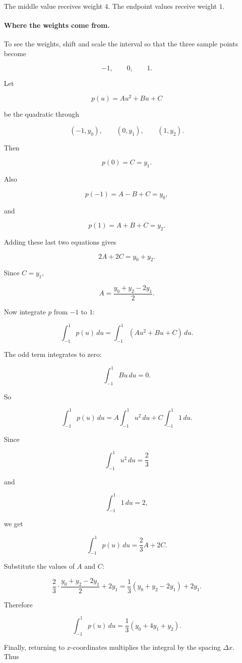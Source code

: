 The middle value receives weight \(4\).  The endpoint values receive weight \(1\).

\paragraph{Where the weights come from.}
To see the weights, shift and scale the interval so that the three sample points become

\[
-1,\qquad 0,\qquad 1.
\]

Let

\[
p(u)=Au^2+Bu+C
\]

be the quadratic through

\[
(-1,y_0),\qquad (0,y_1),\qquad (1,y_2).
\]

Then

\[
p(0)=C=y_1.
\]

Also

\[
p(-1)=A-B+C=y_0,
\]

and

\[
p(1)=A+B+C=y_2.
\]

Adding these last two equations gives

\[
2A+2C=y_0+y_2.
\]

Since \(C=y_1\),

\[
A=\frac{y_0+y_2-2y_1}{2}.
\]

Now integrate \(p\) from \(-1\) to \(1\):

\[
\int_{-1}^{1}p(u)\,du
=
\int_{-1}^{1}(Au^2+Bu+C)\,du.
\]

The odd term integrates to zero:

\[
\int_{-1}^{1}Bu\,du=0.
\]

So

\[
\int_{-1}^{1}p(u)\,du
=
A\int_{-1}^{1}u^2\,du+C\int_{-1}^{1}1\,du.
\]

Since

\[
\int_{-1}^{1}u^2\,du=\frac23
\]

and

\[
\int_{-1}^{1}1\,du=2,
\]

we get

\[
\int_{-1}^{1}p(u)\,du
=
\frac23A+2C.
\]

Substitute the values of \(A\) and \(C\):

\[
\frac23\cdot\frac{y_0+y_2-2y_1}{2}+2y_1
=
\frac13(y_0+y_2-2y_1)+2y_1.
\]

Therefore

\[
\int_{-1}^{1}p(u)\,du
=
\frac13(y_0+4y_1+y_2).
\]

Finally, returning to \(x\)-coordinates multiplies the integral by the spacing
\(\Delta x\).  Thus

